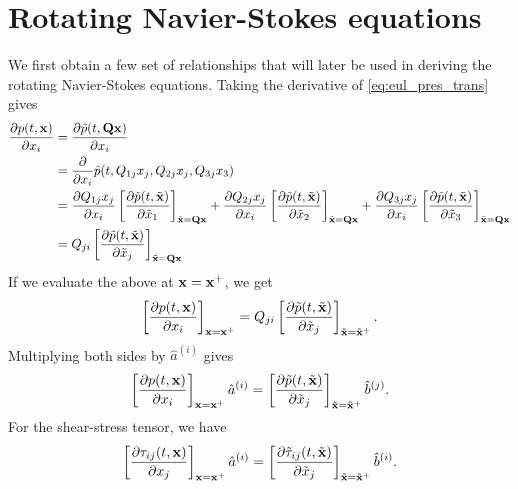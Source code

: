 \documentclass[oneside,a4paper,11pt]{report}
\begin{document}
\section{Rotating Navier-Stokes equations}
We first obtain a few set of relationships that will later be used in deriving the rotating Navier-Stokes equations. Taking the derivative of \cref{eq:eul_pres_trans} gives
\begin{align}
    \frac{\partial p(t,\mathbf{x})}{\partial x_i} &= \frac{ \partial \tilde{p}(t,\mathbf{Q} \mathbf{x})}{\partial x_i} \nonumber \\
    &= \frac{\partial}{\partial x_i} \tilde{p}(t,Q_{1j}x_j, Q_{2j}x_j, Q_{3j} x_3) \nonumber \\
    &= \frac{\partial Q_{1j}x_j}{\partial x_i} \left [ \frac{\partial \tilde{p}(t,\tilde{\mathbf{x}})}{\partial \tilde{x}_1} \right]_{ \tilde{\mathbf{x}} = \mathbf{Q} \mathbf{x}} + \frac{\partial Q_{2j}x_j}{\partial x_i} \left [ \frac{\partial \tilde{p}(t,\tilde{\mathbf{x}})}{\partial \tilde{x}_2} \right ]_{\tilde{\mathbf{x}} = \mathbf{Q} \mathbf{x}} + \frac{\partial Q_{3j}x_j}{\partial x_i} \left [ \frac{\partial \tilde{p}(t,\tilde{\mathbf{x}})}{\partial \tilde{x}_3} \right ]_{\tilde{\mathbf{x}} = \mathbf{Q} \mathbf{x}} \nonumber \\
    &= Q_{ji} \left [ \frac{\partial \tilde{p}(t,\tilde{\mathbf{x}})}{\partial \tilde{x}_j} \right ]_{\tilde{\mathbf{x}} = \mathbf{Q} \mathbf{x}}
\end{align}
If we evaluate the above at $\mathbf{x} = \mathbf{x}^+$, we get
\begin{equation}
    \left [ \frac{\partial p(t,\mathbf{x})}{\partial x_i} \right]_{\mathbf{x} = \mathbf{x}^+} = Q_{ji} \left [ \frac{\partial \tilde{p}(t,\tilde{\mathbf{x}})}{\partial \tilde{x}_j} \right]_{\tilde{\mathbf{x}} = \tilde{\mathbf{x}}^+}.
\end{equation}
Multiplying both sides by $\hat{a}^{(i)}$ gives
\begin{equation}
\label{eq:ns_pressure_rot_transform}
    \left [ \frac{\partial p(t,\mathbf{x})}{\partial x_i} \right]_{\mathbf{x} = \mathbf{x}^+} \hat{a}^{(i)} = \left [ \frac{\partial \tilde{p}(t,\tilde{\mathbf{x}})}{\partial \tilde{x}_j} \right]_{\tilde{\mathbf{x}} = \tilde{\mathbf{x}}^+} \hat{b}^{(j)}.
\end{equation}
For the shear-stress tensor, we have
\begin{equation}
    \label{eq:ns_shear_stress_rot_transform}
    \left [ \frac{\partial \tau_{ij}(t,\mathbf{x})}{\partial x_j} \right]_{\mathbf{x} = \mathbf{x}^+} \hat{a}^{(i)} = \left [ \frac{\partial \tilde{\tau}_{ij}(t,\tilde{\mathbf{x}})}{\partial \tilde{x}_j} \right]_{\tilde{\mathbf{x}} = \tilde{\mathbf{x}}^+} \hat{b}^{(i)}.
\end{equation}
\end{document}
